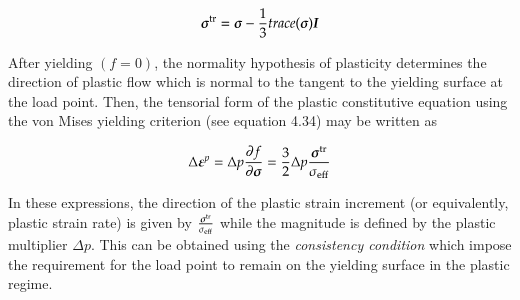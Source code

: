 \begin{equation} \label{eqn:smm:constitutive:deviatoric stress}
	{\ensuremath{\boldsymbol{\sigma}}}^{{\mathrm{tr}}}=\boldsymbol{\sigma} - \frac{1}{3} trace(\boldsymbol{\sigma}) \boldsymbol{I}
\end{equation} 

After yielding $(f = 0)$, the normality hypothesis of plasticity determines the direction of plastic flow which is normal to the tangent to the yielding surface at the load point. Then, the tensorial form of the plastic constitutive equation using the von Mises yielding criterion (see equation 4.34) may be written as

\begin{equation} \label{eqn:smm:constitutive:plastic contitutive equation}
	\Delta {\ensuremath{\boldsymbol{\varepsilon}}}^p = \Delta p \frac {\partial{f}}{\partial{\ensuremath{\boldsymbol{\sigma}}}}=\frac{3}{2} \Delta p \frac{{\boldsymbol{\sigma}}^{{\mathrm{tr}}}}{\sigma_{{\mathrm{eff}}}}
\end{equation}

In these expressions, the direction of the plastic strain increment (or equivalently, plastic strain rate) is given by $\frac{{\boldsymbol{\sigma}}^{{\mathrm{tr}}}}{\sigma_{{\mathrm{eff}}}}$ while the magnitude is defined by the plastic multiplier $\Delta p$. This can be obtained using the \emph{consistency condition} which impose the requirement for the load point to remain on the yielding surface in the plastic regime.

